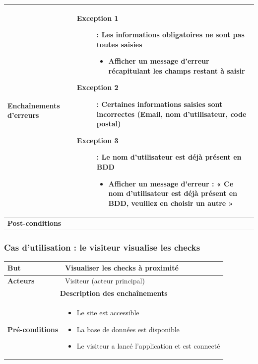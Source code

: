 \documentclass[a4paper,12pt]{report}
\begin{document}
\begin{onehalfspace}
\begin{tabular}{|p{3cm}|p{}|}
\textbf{Enchaînements d'erreurs} &
  \begin{description}
    \item[Exception 1]: Les informations obligatoires ne sont pas toutes saisies
    \begin{itemize}
      \item Afficher un message d’erreur récapitulant les champs restant à saisir
    \end{itemize}
    \item[Exception 2]: Certaines informations saisies sont incorrectes (Email, nom d’utilisateur, code postal)
    \item[Exception 3]: Le nom d’utilisateur est déjà présent en BDD
    \begin{itemize}
      \item Afficher un message d’erreur : « Ce nom d’utilisateur est déjà présent en BDD, veuillez en choisir un autre »
    \end{itemize}
  \end{description}
\\ \hline %

\textbf{Post-conditions} &
\\ \hline %

\end{tabular}

\subsubsection{Cas d'utilisation : le visiteur visualise les checks} %

\begin{tabular}{|p{3cm}|p{}|}
\hline %

\textbf{But} &
Visualiser les checks à proximité
\\ \hline %

\textbf{Acteurs} &
Visiteur (acteur principal)
\\ \hline %

\multicolumn{2}{|c|}{\textbf{Description des enchaînements}}
\\ \hline %

\textbf{Pré-conditions} &
    \begin{itemize}
      \item Le site est accessible
      \item La base de données est disponible
      \item Le visiteur a lancé l'application et est connecté
    \end{itemize}
\\ \hline %


\end{tabular}
\end{onehalfspace}
\end{document}
